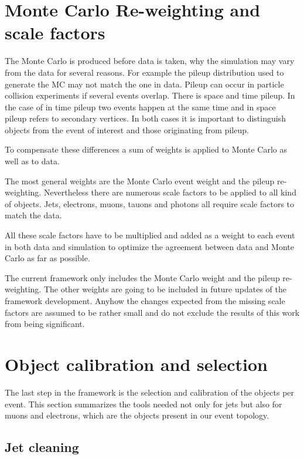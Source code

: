 \section{Monte Carlo Re-weighting and scale factors}

The Monte Carlo is produced before data is taken, why the simulation may vary from the data for several reasons. For example the pileup distribution used to generate the MC may not match the one in data. Pileup can occur in particle collision experiments if several events overlap. There is space and time pileup. In the case of in time pileup two events happen at the same time and in space pileup refers to secondary vertices. In both cases it is important to distinguish objects from the event of interest and those originating from pileup.

To compensate these differences a sum of weights is applied to Monte Carlo as well as to data.

The most general weights are the Monte Carlo event weight and the pileup re-weighting. Nevertheless there are numerous scale factors to be applied to all kind of objects. Jets, electrons, muons, tauons and photons all require scale factors to match the data. 

All these scale factors have to be multiplied and added as a weight to each event in both data and simulation to optimize the agreement between data and Monte Carlo as far as possible.

The current framework only includes the Monte Carlo weight and the pileup re-weighting. The other weights are going to be included in future updates of the framework development. Anyhow the changes expected from the missing scale factors are assumed to be rather small and do not exclude the results of this work from being significant.

\section{Object calibration and selection}

The last step in the framework is the selection and calibration of the objects per event. This section summarizes the tools needed not only for jets but also for muons and electrons, which are the objects present in our event topology.

\subsection{Jet cleaning}

